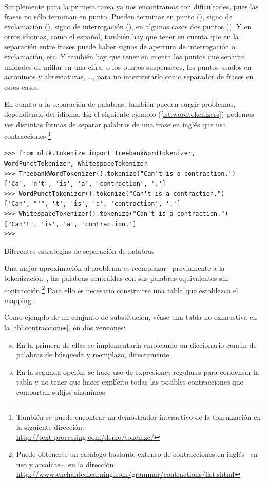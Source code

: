 Simplemente para la primera tarea ya nos encontramos con dificultades, pues las frases no sólo terminan en punto. Pueden terminar en punto (), signo de exclamación (\codep[text]{!}), signo de interrogación (), en algunos casos dos puntos (\codep{:}). Y en otros idiomas, como el español, también hay que tener en cuenta que en la separación entre frases puede haber signos de apertura de interrogación o exclamación, etc. Y también hay que tener en cuenta los puntos que separan unidades de millar en una cifra, o los puntos suspensivos, los puntos usados en acrónimos y abreviaturas, \ldots, para no interpretarlo como separador de frases en estos casos.

En cuanto a la separación de palabras, también pueden surgir problemas, dependiendo del idioma. En el siguiente ejemplo (\autoref{lst:wordtokenizers}) podemos ver distintas formas de separar palabras de una frase en inglés que usa contracciones.\footnote{También se puede encontrar un demostrador interactivo de la tokenización en la siguiente dirección:\\
\url{http://text-processing.com/demo/tokenize/}}

\begin{listing}[H]
\begin{verbatim}
>>> from nltk.tokenize import TreebankWordTokenizer, WordPunctTokenizer, WhitespaceTokenizer
>>> TreebankWordTokenizer().tokenize("Can't is a contraction.")
['Ca', "n't", 'is', 'a', 'contraction', '.']
>>> WordPunctTokenizer().tokenize("Can't is a contraction.")
['Can', "'", 't', 'is', 'a', 'contraction', '.']
>>> WhitespaceTokenizer().tokenize("Can't is a contraction.")
["Can't", 'is', 'a', 'contraction.']
>>> 
\end{verbatim}
\caption{Diferentes estrategias de separación de palabras}
\label{lst:wordtokenizers}
\end{listing}

Una mejor aproximación al problema es reemplazar --previamente a la tokenización--, las palabras contraídas con sus palabras equivalentes sin contracción.\footnote{Puede obtenerse un catálogo bastante extenso de contracciones en inglés --en uso y arcaicas--, en la dirección: \url{http://www.enchantedlearning.com/grammar/contractions/list.shtml}}
Para ello es necesario construirse una tabla que establezca el mapping \citep{Perkins2014}.

Como ejemplo de un conjunto de substitución, véase una tabla no exhaustiva en la \autoref{tbl:contracciones}, en dos versiones:
\nopagebreak
\begin{enumerate}[(a)]
\item En la primera de ellas se implementaría empleando un diccionario común de palabras de búsqueda y reemplazo, directamente.
\item En la segunda opción, se hace uso de expresiones regulares para condensar la tabla y no tener que hacer explícito todas las posibles contracciones que compartan sufijos sinónimos.
\end{enumerate}

